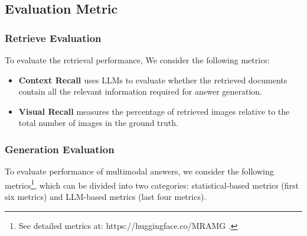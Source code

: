 
\subsection{Evaluation Metric}

\subsubsection{Retrieve Evaluation}

To evaluate the retrieval performance, 
We consider the following metrics:

\begin{itemize}
    \item 
    \textbf{Context Recall \citep{es2023ragas}} uses LLMs to evaluate whether the retrieved documents contain all the relevant  information required for answer generation.
    \item 
    \textbf{Visual Recall} measures the percentage of retrieved images relative to the total number of images in the ground truth.
\end{itemize}

\subsubsection{Generation Evaluation}

To evaluate performance of multimodal answers, we consider the following metrics\footnote{See detailed metrics at: https://huggingface.co/MRAMG
.}, which can be divided into two categories: statistical-based metrics (first six metrics) and LLM-based metrics (last four metrics). %

